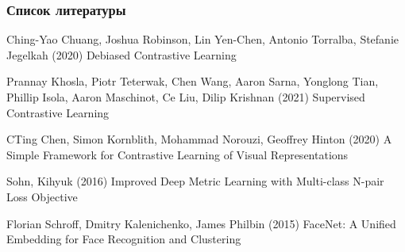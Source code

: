 \documentclass[
	11pt, %
	t, %
        russian
]{beamer}
\begin{document}
\begin{frame} 
	\frametitle{Список литературы}
	
	\begin{thebibliography}{99} 
		\footnotesize
		
			Ching-Yao Chuang, Joshua Robinson, Lin Yen-Chen, Antonio Torralba, Stefanie Jegelkah (2020)
			\newblock Debiased Contrastive Learning

			Prannay Khosla, Piotr Teterwak, Chen Wang, Aaron Sarna, Yonglong Tian, Phillip Isola, Aaron Maschinot, Ce Liu, Dilip Krishnan (2021)
			\newblock Supervised Contrastive Learning

			CTing Chen, Simon Kornblith, Mohammad Norouzi, Geoffrey Hinton (2020)
			\newblock A Simple Framework for Contrastive Learning of Visual Representations

			Sohn, Kihyuk (2016)
			\newblock Improved Deep Metric Learning with Multi-class N-pair Loss Objective

			Florian Schroff, Dmitry Kalenichenko, James Philbin (2015)
			\newblock FaceNet: A Unified Embedding for Face Recognition and Clustering

	\end{thebibliography}
\end{frame}
\end{document}

